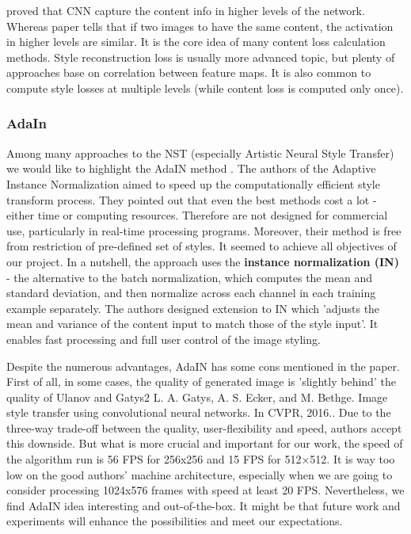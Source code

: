 \documentclass[../Main.tex]{subfiles}
\begin{document}
     proved that CNN capture the content info in higher levels of the network. Whereas  paper tells that if two images to have the same content, the activation in higher levels are similar. It is the core idea of many content loss calculation methods.
    Style reconstruction loss is usually more advanced topic, but plenty of approaches base on correlation between feature maps. It is also common to compute style losses at multiple levels (while content loss is computed only once).

    \subsubsection{AdaIn}
    Among many approaches to the NST (especially Artistic Neural Style Transfer) we would like to highlight the AdaIN method \cite{huang2017adain}. The authors of the Adaptive Instance Normalization aimed to speed up the computationally efficient style transform process. They pointed out that even the best methods cost a lot - either time or computing resources. Therefore are not designed for commercial use, particularly in real-time processing programs. Moreover, their method is free from restriction of pre-defined set of styles. It seemed to achieve all objectives of our project.
    In a nutshell, the approach uses the \textbf{instance normalization (IN)} - the alternative to the batch normalization, which computes the mean and standard deviation, and then normalize across each channel in each training example separately. The authors designed extension to IN which 'adjusts the mean and variance of the
    content input to match those of the style input'. It enables fast processing and full user control of the image styling.
    
    Despite the numerous advantages, AdaIN has some cons mentioned in the paper. First of all, in some cases, the quality of generated image is 'slightly behind' the quality of Ulanov  and Gatys2 {L. A. Gatys, A. S. Ecker, and M. Bethge. Image style transfer
    using convolutional neural networks. In CVPR, 2016.}. Due to the three-way trade-off between the quality, user-flexibility and speed, authors accept this downside. But what is more crucial and important for our work, the speed of the algorithm run is 56 FPS for 256x256 and 15 FPS for 512×512. It is way too low on the good authors' machine architecture, especially when we are going to consider processing 1024x576 frames with speed at least 20 FPS.
    Nevertheless, we find AdaIN idea interesting and out-of-the-box. It might be that future work and experiments will enhance the possibilities and meet our expectations.
\end{document}
